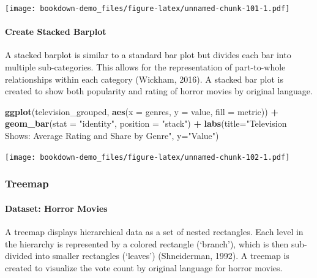 \documentclass[
  b5paper]{book}
\newenvironment{Shaded}{\begin{snugshade}}{\end{snugshade}}
\newcommand{\AttributeTok}[1]{\textcolor[rgb]{0.13,0.29,0.53}{#1}}
\newcommand{\FunctionTok}[1]{\textcolor[rgb]{0.13,0.29,0.53}{\textbf{#1}}}
\newcommand{\NormalTok}[1]{#1}
\newcommand{\SpecialCharTok}[1]{\textcolor[rgb]{0.81,0.36,0.00}{\textbf{#1}}}
\newcommand{\StringTok}[1]{\textcolor[rgb]{0.31,0.60,0.02}{#1}}
\begin{document}
\texttt{[image: bookdown-demo\_files/figure-latex/unnamed-chunk-101-1.pdf]}

\hypertarget{create-stacked-barplot}{%
\paragraph*{Create Stacked Barplot}\label{create-stacked-barplot}}

A stacked barplot is similar to a standard bar plot but divides each bar into multiple sub-categories. This allows for the representation of part-to-whole relationships within each category (Wickham, 2016). A stacked bar plot is created to show both popularity and rating of horror movies by original language.

\begin{Shaded}
\begin{Highlighting}[]
\FunctionTok{ggplot}\NormalTok{(television\_grouped, }\FunctionTok{aes}\NormalTok{(}\AttributeTok{x =}\NormalTok{ genres, }\AttributeTok{y =}\NormalTok{ value, }\AttributeTok{fill =}\NormalTok{ metric)) }\SpecialCharTok{+}
  \FunctionTok{geom\_bar}\NormalTok{(}\AttributeTok{stat =} \StringTok{"identity"}\NormalTok{, }\AttributeTok{position =} \StringTok{"stack"}\NormalTok{) }\SpecialCharTok{+}
  \FunctionTok{labs}\NormalTok{(}\AttributeTok{title=}\StringTok{"Television Shows: Average Rating and Share by Genre"}\NormalTok{, }\AttributeTok{y=}\StringTok{"Value"}\NormalTok{) }
\end{Highlighting}
\end{Shaded}

\texttt{[image: bookdown-demo\_files/figure-latex/unnamed-chunk-102-1.pdf]}

\hypertarget{treemap}{%
\subsubsection*{Treemap}\label{treemap}}

\hypertarget{dataset-horror-movies}{%
\paragraph*{Dataset: Horror Movies}\label{dataset-horror-movies}}

A treemap displays hierarchical data as a set of nested rectangles. Each level in the hierarchy is represented by a colored rectangle (`branch'), which is then sub-divided into smaller rectangles (`leaves') (Shneiderman, 1992). A treemap is created to visualize the vote count by original language for horror movies.
\end{document}
